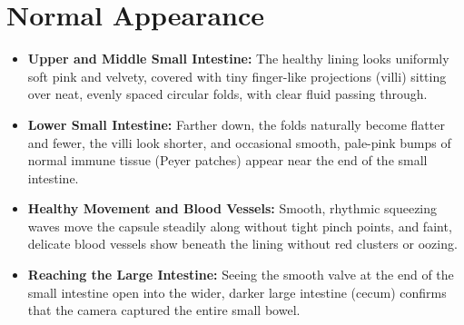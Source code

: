 \section{Normal Appearance}
\begin{itemize}
    \item \textbf{Upper and Middle Small Intestine:} The healthy lining looks uniformly soft pink and velvety, covered with tiny finger-like projections (villi) sitting over neat, evenly spaced circular folds, with clear fluid passing through.
    \item \textbf{Lower Small Intestine:} Farther down, the folds naturally become flatter and fewer, the villi look shorter, and occasional smooth, pale-pink bumps of normal immune tissue (Peyer patches) appear near the end of the small intestine.
    \item \textbf{Healthy Movement and Blood Vessels:} Smooth, rhythmic squeezing waves move the capsule steadily along without tight pinch points, and faint, delicate blood vessels show beneath the lining without red clusters or oozing.
    \item \textbf{Reaching the Large Intestine:} Seeing the smooth valve at the end of the small intestine open into the wider, darker large intestine (cecum) confirms that the camera captured the entire small bowel.
\end{itemize}

